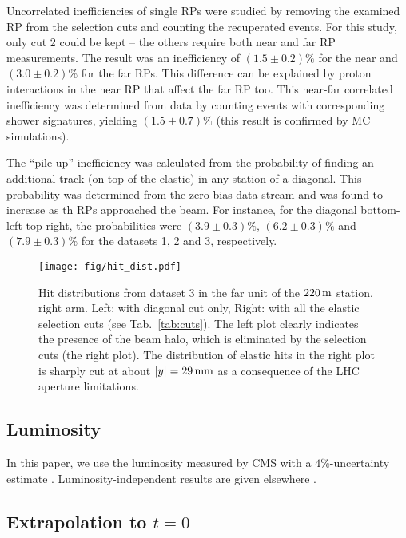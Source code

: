 \documentclass[doublecol]{../macros/epl2}
\def\un#1{\,{\rm #1}}
\begin{document}
Uncorrelated inefficiencies of single RPs were studied by removing the examined RP from the selection cuts and counting the recuperated events. For this study, only cut 2 could be kept -- the others require both near and far RP measurements. The result was an inefficiency of $(1.5 \pm 0.2)\%$ for the near and $(3.0 \pm 0.2)\%$ for the far RPs. This difference can be explained by proton interactions in the near RP that affect the far RP too. This near-far correlated inefficiency was determined from data by counting events with corresponding shower signatures, yielding $(1.5\pm 0.7)\%$ (this result is confirmed by MC simulations).

The ``pile-up'' inefficiency was calculated from the probability of finding an additional track (on top of the elastic) in any station of a diagonal. This probability was determined from the zero-bias data stream and was found to increase as th RPs approached the beam. For instance, for the diagonal bottom-left top-right, the probabilities were $(3.9 \pm 0.3)\%$, $(6.2 \pm 0.3)\%$ and $(7.9 \pm 0.3)\%$ for the datasets 1, 2 and 3, respectively.


\begin{figure*}
\hbox{}\vskip-7mm
\begin{center}
\texttt{[image: fig/hit\_dist.pdf]}
\vskip-5mm
\caption{Hit distributions from dataset 3 in the far unit of the $220\un{m}$ station, right arm. Left: with diagonal cut only, Right: with all the elastic selection cuts (see Tab.~\ref{tab:cuts}). The left plot clearly indicates the presence of the beam halo, which is eliminated by the selection cuts (the right plot). The distribution of elastic hits in the right plot is sharply cut at about $|y| = 29\un{mm}$ as a consequence of the LHC aperture limitations. }
\label{fig:hit dist}
\end{center}
\end{figure*}

\subsection{Luminosity}

In this paper, we use the luminosity measured by CMS with a $4\%$-uncertainty estimate%
. Luminosity-independent results are given elsewhere \cite{P3}.


\subsection{Extrapolation to $t=0$}
\end{document}
